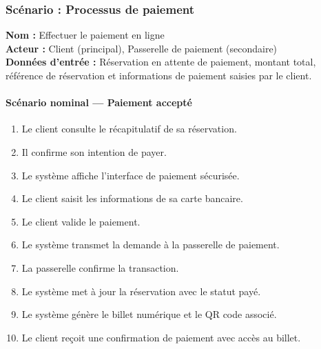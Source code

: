 \documentclass[12pt]{report}
\begin{document}
\subsubsection{Scénario : Processus de paiement}

\textbf{Nom :} Effectuer le paiement en ligne \\
\textbf{Acteur :} Client (principal), Passerelle de paiement (secondaire) \\
\textbf{Données d'entrée :} Réservation en attente de paiement, montant total,
référence de réservation et informations de paiement saisies par le client.

\paragraph{Scénario nominal — Paiement accepté}
\begin{enumerate}
    \item Le client consulte le récapitulatif de sa réservation.
    \item Il confirme son intention de payer.
    \item Le système affiche l'interface de paiement sécurisée.
    \item Le client saisit les informations de sa carte bancaire.
    \item Le client valide le paiement.
    \item Le système transmet la demande à la passerelle de paiement.
    \item La passerelle confirme la transaction.
    \item Le système met à jour la réservation avec le statut payé.
    \item Le système génère le billet numérique et le QR code associé.
    \item Le client reçoit une confirmation de paiement avec accès au billet.
\end{enumerate}
\end{document}
